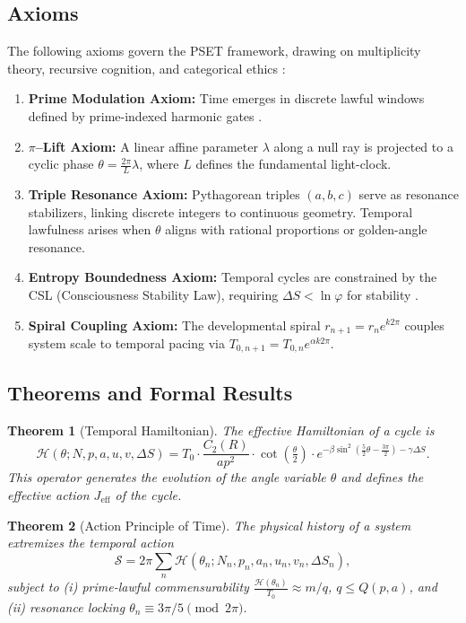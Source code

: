 \documentclass[12]{amsart}
\theoremstyle{plain}
\newtheorem{theorem}{Theorem}[section]
\begin{document}
\subsection{Axioms}
The following axioms govern the PSET framework, drawing on multiplicity theory, recursive cognition, and categorical ethics \cite{YantraUniverse,PhenomenologyPhysics,LanglandsPrism}:
\begin{enumerate}
    \item \textbf{Prime Modulation Axiom:} Time emerges in discrete lawful windows defined by prime-indexed harmonic gates \cite{ArchaeoAstronomy}.
    \item \textbf{$\pi$--Lift Axiom:} A linear affine parameter $\lambda$ along a null ray is projected to a cyclic phase $\theta = \tfrac{2\pi}{L}\lambda$, where $L$ defines the fundamental light-clock.
    \item \textbf{Triple Resonance Axiom:} Pythagorean triples $(a,b,c)$ serve as resonance stabilizers, linking discrete integers to continuous geometry. Temporal lawfulness arises when $\theta$ aligns with rational proportions or golden-angle resonance.
    \item \textbf{Entropy Boundedness Axiom:} Temporal cycles are constrained by the CSL (Consciousness Stability Law), requiring $\Delta S < \ln \varphi$ for stability \cite{PhenomenologyPhysics}.
    \item \textbf{Spiral Coupling Axiom:} The developmental spiral $r_{n+1} = r_n e^{k2\pi}$ couples system scale to temporal pacing via $T_{0,n+1} = T_{0,n} e^{\alpha k 2\pi}$.
\end{enumerate}

\subsection{Theorems and Formal Results}
\begin{theorem}[Temporal Hamiltonian]
The effective Hamiltonian of a cycle is
\[
\mathcal{H}(\theta;N,p,a,u,v,\Delta S) = T_0 \cdot \frac{C_2(R)}{ap^2}\cdot \cot\!\left(\tfrac{\theta}{2}\right) 
\cdot e^{-\beta \sin^2(\tfrac{5}{2}\theta - \tfrac{3\pi}{2}) - \gamma \Delta S}.
\]
This operator generates the evolution of the angle variable $\theta$ and defines the effective action $J_{\mathrm{eff}}$ of the cycle.
\end{theorem}

\begin{theorem}[Action Principle of Time]
The physical history of a system extremizes the temporal action
\[
\mathcal{S} = 2\pi \sum_{n} \mathcal{H}(\theta_n;N_n,p_n,a_n,u_n,v_n,\Delta S_n),
\]
subject to (i) prime-lawful commensurability $\tfrac{\mathcal{H}(\theta_n)}{T_0}\approx m/q$, $q\leq Q(p,a)$, and (ii) resonance locking $\theta_n \equiv 3\pi/5 \pmod{2\pi}$.
\end{theorem}
\end{document}
